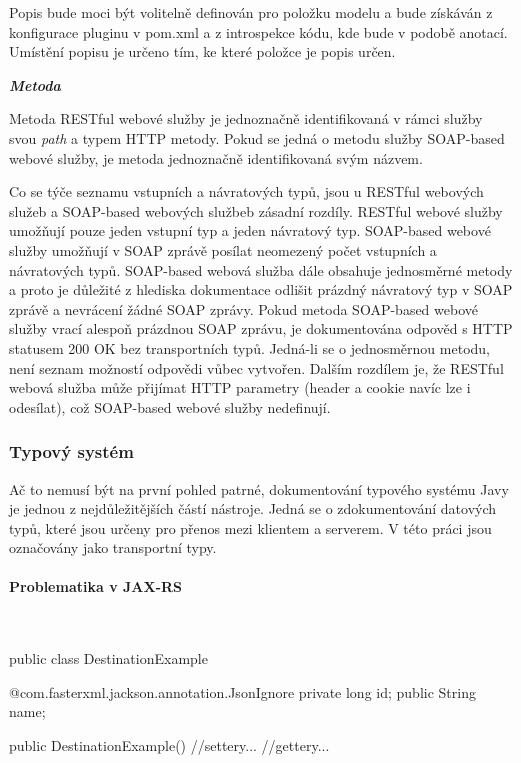 \documentclass[11pt,twoside,a4paper]{book}
\begin{document}
Popis bude moci být volitelně definován pro položku modelu a bude získáván z konfigurace
pluginu v pom.xml a z introspekce kódu, kde bude v podobě anotací. Umístění popisu je
určeno tím, ke které položce je popis určen.

\textbf{\textit{Metoda}}

Metoda RESTful webové služby je jednoznačně identifikovaná v rámci služby svou
{\em path} a typem HTTP metody.
Pokud se jedná o metodu služby SOAP-based webové služby, je metoda jednoznačně
identifikovaná svým názvem.

Co se týče seznamu vstupních a návratových typů, jsou u RESTful webových služeb
a SOAP-based webových službeb zásadní rozdíly. RESTful webové služby umožňují
pouze jeden vstupní typ a jeden návratový typ. SOAP-based webové služby umožňují
v SOAP zprávě posílat neomezený počet vstupních a návratových typů. SOAP-based
webová služba dále obsahuje jednosměrné metody a proto je důležité z hlediska
dokumentace odlišit prázdný návratový typ v SOAP zprávě a nevrácení žádné SOAP
zprávy. Pokud metoda SOAP-based webové služby vrací alespoň prázdnou SOAP
zprávu, je dokumentována odpověd s HTTP statusem 200 OK bez transportních typů.
Jedná-li se o jednosměrnou metodu, není seznam možností odpovědi vůbec vytvořen.
Dalším rozdílem je, že RESTful webová služba může přijímat HTTP parametry
(header a cookie navíc lze i odesílat), což SOAP-based webové služby nedefinují.

\subsubsection{Typový systém}
\label{subsec:typovy-system}

Ač to nemusí být na první pohled patrné, dokumentování typového systému Javy je jednou z
nejdůležitějších částí nástroje. Jedná se o zdokumentování datových typů, které jsou určeny
pro přenos mezi klientem a serverem. V této práci jsou označovány jako transportní typy.

\paragraph{Problematika v JAX-RS}
\mbox{}\\

\begin{code}[frame=single,caption={Definice transportního
typu},label={lst:definice-transportniho-typu}] 
public class DestinationExample {

    @com.fasterxml.jackson.annotation.JsonIgnore
    private long id;
    public String name;

    public DestinationExample() {}
    //settery...
    //gettery...
}
\end{code}
\end{document}
